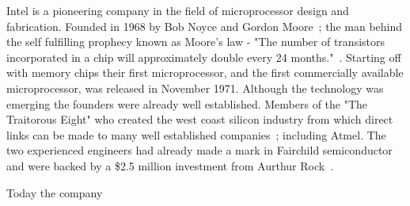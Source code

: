 

Intel is a pioneering company in the field of microprocessor design and fabrication.
Founded in 1968 by Bob Noyce and Gordon Moore~\cite{IntelHistory}; the man behind the self fulfilling prophecy known as Moore's law - "The number of transistors incorporated in a chip will approximately double every 24 months."~\cite{IntelMoore}.
Starting off with memory chips their first microprocessor, and the first commercially available microprocessor, was released in November 1971.
Although the technology was emerging the founders were already well established.
Members of the "The Traitorous Eight" who created the west coast silicon industry from which direct links can be made to many well established companies~\cite{Eight}; including Atmel.
The two experienced engineers had already made a mark in Fairchild semiconductor~\cite{Fairchild} and were backed by a \$2.5 million investment from Aurthur Rock~\cite{IntelStartup}.

Today the company 
